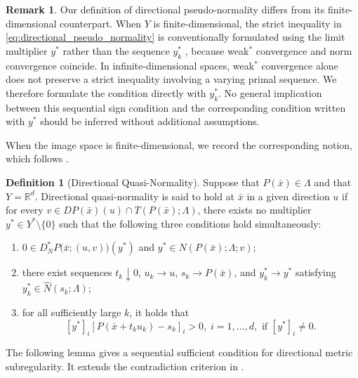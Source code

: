 \documentclass[12pt,twoside,reqno]{amsart}
\theoremstyle{definition}
\newtheorem{definition}[theorem]{Definition}
\newtheorem{remark}[theorem]{Remark}
\numberwithin{equation}{section}
\begin{document}
\begin{remark}
    Our definition of directional pseudo-normality differs from its finite-dimensional counterpart. When $Y$ is finite-dimensional, the strict inequality in \eqref{eq:directional_pseudo_normality} is conventionally formulated using the limit multiplier $y^*$ rather than the sequence $y_k^*$ \cite[Definition~4.1]{bai2019directional}, because weak\(^*\) convergence and norm convergence coincide. In infinite-dimensional spaces, weak\(^*\) convergence alone does not preserve a strict inequality involving a varying primal sequence. We therefore formulate the condition directly with $y_k^*$. No general implication between this sequential sign condition and the corresponding condition written with $y^*$ should be inferred without additional assumptions.
\end{remark}

When the image space is finite-dimensional, we record the corresponding notion, which follows \cite[Definition~4.1]{bai2019directional}.

\begin{definition}[Directional Quasi-Normality] \label{defn:directional_quasi_normality}
    Suppose that $P(\bar{x}) \in \Lambda$ and that $Y=\mathbb{R}^d$. Directional quasi-normality is said to hold at $\bar{x}$ in a given direction $u$ if for every $v \in DP(\bar{x})(u) \cap T(P(\bar{x}); \Lambda)$, there exists no multiplier $y^* \in Y^* \setminus \{0\}$ such that the following three conditions hold simultaneously:
    \begin{enumerate}
        \item[(i)] $0 \in D_N^* P\big(\bar{x}; (u,v)\big)(y^*)$ and $y^* \in N(P(\bar{x}); \Lambda; v)$;
        \item[(ii)] there exist sequences $t_k \downarrow 0$, $u_k \to u$, $s_k \to P(\bar{x})$, and $y_k^* \to y^*$ satisfying $y_k^* \in \widehat{N}(s_k; \Lambda)$;
        \item[(iii)] for all sufficiently large $k$, it holds that
        \begin{equation}\label{eq:directional_quasi_normality}
            [y^*]_i[P(\bar{x} + t_k u_k) - s_k]_i> 0,\; i=1,\dots,d, \text{ if } [y^*]_i\neq 0.
        \end{equation}
    \end{enumerate}
\end{definition}

The following lemma gives a sequential sufficient condition for directional metric subregularity. It extends the contradiction criterion in \cite[Lemma~3.1]{bai2019directional}.
\end{document}
